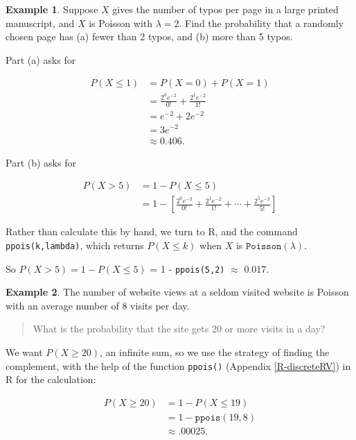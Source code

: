 \documentclass[
]{book}
\theoremstyle{definition}
\theoremstyle{definition}
\newtheorem{example}{Example}[chapter]
\theoremstyle{definition}
\theoremstyle{definition}
\theoremstyle{remark}
\begin{document}
\begin{example}
\protect\hypertarget{exm:poisson-typos}{}\label{exm:poisson-typos}Suppose \(X\) gives the number of typos per page in a large printed manuscript, and \(X\) is Poisson with \(\lambda = 2\). Find the probability that a randomly chosen page has (a) fewer than 2 typos, and (b) more than 5 typos.

Part (a) asks for

\begin{align*}
P(X\leq 1) &= P(X = 0)+P(X=1) \\
&= \frac{2^0e^{-2}}{0!}+\frac{2^1e^{-2}}{1!}\\
&= e^{-2} + 2e^{-2} \\
&=3 e^{-2} \\
&\approx 0.406.
\end{align*}

Part (b) asks for

\begin{align*}
P(X >  5) &= 1 - P(X \leq 5) \\
&= 1 - \left[ \frac{2^0e^{-2}}{0!}+\frac{2^1e^{-2}}{1!} +  \cdots + \frac{2^5e^{-2}}{5!}\right]
\end{align*}

Rather than calculate this by hand, we turn to R, and the command \texttt{ppois(k,lambda)}, which returns \(P(X \leq k)\) when \(X\) is \(\texttt{Poisson}(\lambda)\).

So \(P(X > 5) = 1 - P(X \leq 5)\) = 1 - \texttt{ppois(5,2)} \(\approx\) 0.017.
\end{example}

\begin{example}
\protect\hypertarget{exm:pois-website}{}\label{exm:pois-website}The number of website views at a seldom visited website is Poisson with an average number of 8 visits per day.

\begin{quote}
What is the probability that the site gets 20 or more visits in a day?
\end{quote}

We want \(P(X \geq 20)\), an infinite sum, so we use the strategy of finding the complement, with the help of the function \texttt{ppois()} (Appendix \ref{R-discreteRV}) in R for the calculation:

\begin{align*}
P(X \geq 20) &= 1 - P(X \leq 19) \\
&= 1 - \texttt{ppois}(19,8)\\
&\approx .00025.
\end{align*}
\end{example}
\end{document}
